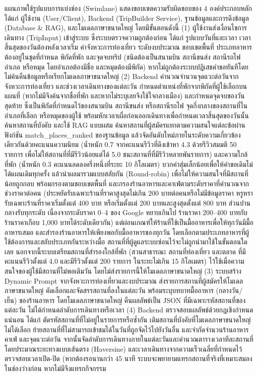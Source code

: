 แผนภาพใช้รูปแบบการแบ่งช่อง (Swimlane) แสดงขอบเขตความรับผิดชอบของ 4 องค์ประกอบหลัก ได้แก่ ผู้ใช้งาน (User/Client), Backend (TripBuilder Service), ฐานข้อมูลและการดึงข้อมูล (Database \& RAG), และโมเดลภาษาขนาดใหญ่ โดยมีขั้นตอนดังนี้ (1) ผู้ใช้งานส่งเงื่อนไขการเดินทาง (TripInput) เข้าสู่ระบบ ซึ่งระบบตรวจความถูกต้องก่อน ได้แก่ รูปแบบวันที่และเวลา เวลาสิ้นสุดของวันต้องหลังเวลาเริ่ม ค่าจังหวะการท่องเที่ยว ระดับงบประมาณ ขอบเขตพื้นที่ ประเภทอาหารต้องอยู่ในชุดที่กำหนด พิกัดที่พัก และจุดจบทริป (ชนิดต้องเป็นสนามบิน สถานีขนส่ง สถานีรถไฟ อำเภอ หรือหมุด โดยอำเภอต้องมีชื่อ และหมุดต้องมีพิกัด) หากไม่ถูกต้องระบบปฏิเสธคำขอทันทีโดยไม่ค้นคืนข้อมูลหรือเรียกโมเดลภาษาขนาดใหญ่ (2) Backend คำนวณจำนวนจุดแวะต่อวันจากจังหวะการท่องเที่ยว และช่วงเวลาเดินทางของแต่ละวัน กำหนดตำแหน่งที่พักจากพิกัดที่ผู้ใช้เลือกบนแผนที่ (หากไม่มีจึงค้นจากชื่อที่พัก และหากไม่ระบุเลยจึงใช้ใจกลางเมือง) และกำหนดจุดจบของวันสุดท้าย ซึ่งเป็นพิกัดที่กำหนดไว้ของสนามบิน สถานีขนส่ง หรือสถานีรถไฟ จุดกึ่งกลางของสถานที่ในอำเภอที่เลือก หรือหมุดของผู้ใช้ พร้อมหักเวลาเผื่อก่อนออกเดินทางเพื่อกำหนดเวลาสิ้นสุดของวันนั้น ค้นหาสถานที่บังคับ และใช้ RAG แบบผสม ค้นหาสถานที่ผู้สมัครแยกตามความสนใจแต่ละข้อผ่านฟังก์ชัน match\_places\_ranked ของฐานข้อมูล แล้วจัดอันดับใหม่ภายในระดับความเกี่ยวข้องเดียวกันด้วยคะแนนความนิยม (น้ำหนัก 0.7 จากคะแนนรีวิวที่ดึงเข้าหา 4.3 ด้วยรีวิวสมมติ 50 รายการ เพื่อไม่ให้สถานที่ที่มีรีวิวน้อยแต่ได้ 5.0 ชนะสถานที่ที่มีรีวิวหลายพันรายการ) และความใกล้ที่พัก (น้ำหนัก 0.3 คะแนนลดลงครึ่งหนึ่งที่ระยะ 10 กิโลเมตร) บวกค่าสุ่มเล็กน้อยเพื่อให้คำขอเดิมไม่ได้แผนเดิมทุกครั้ง แล้วนำผลมารวมแบบสลับกัน (Round-robin) เพื่อไม่ให้ความสนใจที่มีสถานที่น้อยถูกกลบ พร้อมกรองตามขอบเขตพื้นที่ และกรองร้านอาหารและคาเฟ่ตามระดับราคาที่คำนวณจากช่วงราคาต่อคน (ประหยัดรับเฉพาะร้านที่ราคาสูงสุดไม่เกิน 200 บาทต่อคนหรือไม่มีข้อมูลราคา หรูหรารับเฉพาะร้านที่ราคาเริ่มตั้งแต่ 400 บาท หรือเริ่มตั้งแต่ 200 บาทและสูงสุดตั้งแต่ 800 บาท ส่วนปานกลางรับทุกระดับ เนื่องจากระดับราคา 0--4 ของ Google หยาบเกินไป ร้านราคา 200--400 บาทกับร้านราคาเกือบ 1,000 บาทได้ระดับเดียวกัน) แต่ผ่อนเกณฑ์ให้ร้านที่ใช้เป็นมื้ออาหารเพื่อให้ทุกวันมีมื้ออาหารเสมอ และสำรองร้านอาหารให้เพียงพอกับมื้ออาหารของทุกวัน โดยเลือกตามประเภทอาหารที่ผู้ใช้ต้องการและสลับประเภทกันระหว่างมื้อ สถานที่ที่ผู้ดูแลระบบซ่อนไว้จะไม่ถูกนำมาใช้ในขั้นตอนใดเลย นอกจากนี้ระบบเตรียมสถานที่สำรองใกล้ที่พัก (สวนสาธารณะ สถานที่ท่องเที่ยว และตลาด ที่มีคะแนนรีวิวตั้งแต่ 4.0 และมีรีวิวตั้งแต่ 200 รายการ ในระยะไม่เกิน 15 กิโลเมตร) ไว้ใช้เมื่อความสนใจของผู้ใช้มีสถานที่ไม่พอเติมวัน โดยไม่ส่งรายการนี้ให้โมเดลภาษาขนาดใหญ่ (3) ระบบสร้าง Dynamic Prompt จากจังหวะการท่องเที่ยวและงบประมาณ ส่งรายการสถานที่ผู้สมัครให้โมเดลภาษาขนาดใหญ่ คัดเลือกและจัดสรรสถานที่ลงในแต่ละวัน พร้อมระบุบทบาทมื้ออาหาร (กลางวัน/เย็น) ของร้านอาหาร โดยโมเดลภาษาขนาดใหญ่ คืนผลลัพธ์เป็น JSON ที่มีเฉพาะรหัสสถานที่ของแต่ละวัน ไม่ได้กำหนดลำดับการเดินทางหรือเวลา (4) Backend ตรวจสอบผลลัพธ์ด้วยกฎเชิงกำหนดแน่นอน ได้แก่ ตัดรหัสสถานที่ที่ไม่อยู่ในรายการหรือซ้ำกัน เติมสถานที่บังคับที่โมเดลภาษาขนาดใหญ่ ไม่ได้เลือก ย้ายสถานที่ที่ไม่สามารถเข้าชมได้ในวันที่ถูกจัดไว้ไปยังวันอื่น และจำกัดจำนวนร้านอาหาร คาเฟ่ และจุดแวะต่อวัน จากนั้นจัดลำดับการเดินทางภายในแต่ละวันและคำนวณตารางเวลาทีละสถานที่ โดยประมาณระยะทางแบบเส้นตรง (Haversine) และเวลาเดินทางจากความเร็วเฉลี่ยที่กำหนดไว้ ตรวจสอบเวลาเปิด-ปิด (หากต้องรอนานกว่า 45 นาที ระบบจะพยายามแทรกสถานที่จริงที่เหมาะสมลงในช่องว่างก่อน หากไม่มีจึงแทรกกิจกรรม 